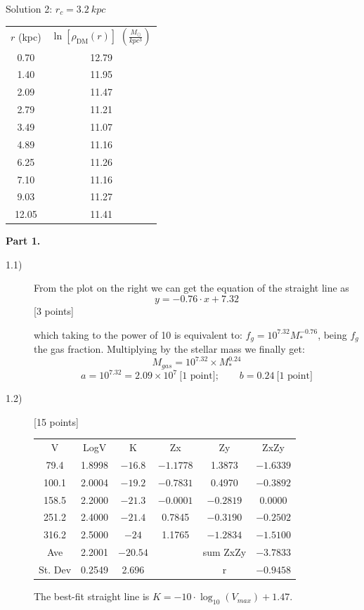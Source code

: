 \begin{description}
  Solution 2: $r_c = 3.2\ kpc$

  \begin{center}
  \begin{tabular}{cc}
  $r$ (kpc) & $\ln\left[\rho_{\mathrm{DM}}(r)\right]$
    $\left(\frac{M_\odot}{kpc^3}\right)$\\
  0.70 & 12.79\\
  1.40 & 11.95\\
  2.09 & 11.47\\
  2.79 & 11.21\\
  3.49 & 11.07\\
  4.89 & 11.16\\
  6.25 & 11.26\\
  7.10 & 11.16\\
  9.03 & 11.27\\
  12.05 & 11.41
  \end{tabular}
  \end{center}
\end{description}

\textbf{Part 1.}

\begin{description}
\item[1.1)] From the plot on the right we can get the equation of the
  straight line as
  \[ y = -0.76\cdot x + 7.32 \]
  \hfill[3 points]

  which taking to the power of 10 is equivalent to:
  $f_g = 10^{7.32}M_*^{-0.76}$, being $f_g$ the gas fraction. Multiplying
  by the stellar mass we finally get:
  \[ M_{gas} = 10^{7.32}\times M_*^{0.24} \]
  \[ a = 10^{7.32} = 2.09\times 10^{7}\ \text{[1 point]};\qquad
     b = 0.24\ \text{[1 point]} \]

\item[1.2)] \hfill[15 points]

  \begin{center}
  \begin{tabular}{cccccc}
  V & LogV & K & Zx & Zy & ZxZy\\
  79.4 & 1.8998 & $-16.8$ & $-1.1778$ & 1.3873 & $-1.6339$\\
  100.1 & 2.0004 & $-19.2$ & $-0.7831$ & 0.4970 & $-0.3892$\\
  158.5 & 2.2000 & $-21.3$ & $-0.0001$ & $-0.2819$ & 0.0000\\
  251.2 & 2.4000 & $-21.4$ & 0.7845 & $-0.3190$ & $-0.2502$\\
  316.2 & 2.5000 & $-24$ & 1.1765 & $-1.2834$ & $-1.5100$\\
  \hline
  Ave & 2.2001 & $-20.54$ & & sum ZxZy & $-3.7833$\\
  St. Dev & 0.2549 & 2.696 & & r & $-0.9458$
  \end{tabular}
  \end{center}

  The best-fit straight line is
  $K = -10\cdot\log_{10}(V_{max}) + 1.47$.
\end{description}

